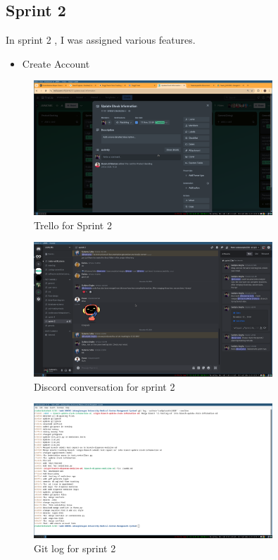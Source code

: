 \documentclass[a4paper,12pt]{article}
\begin{document}
\subsection{Sprint 2}
In sprint 2 , I was assigned various features.
\begin{itemize}
    \item Create Account
\end{itemize}

\begin{figure}[H]
    \centering
    \includegraphics[width=0.8\textwidth]{images/trello_sprint2.png}
    \caption{Trello for Sprint 2}
    \label{fig:trellosprint2}
\end{figure}


\begin{figure}[H]
    \centering
    \includegraphics[width=0.8\textwidth]{images/discord_sprint2.png}
    \caption{Discord conversation for sprint 2}
    \label{fig:discordsprint2}
\end{figure}


\begin{figure}[H]
    \centering
    \includegraphics[width=0.8\textwidth]{images/git_sprint2.png}
    \caption{Git log for sprint 2}
    \label{fig:gitsprint2}
\end{figure}
\end{document}
